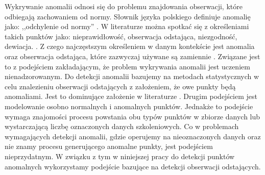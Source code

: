 Wykrywanie anomalii odnosi się do problemu znajdowania obserwacji, które odbiegają zachowaniem od normy. Słownik języka polskiego definiuje anomalię jako: ,,odchylenie od normy'' \cite{pwn}. 
W literaturze można spotkać się z określeniami takich punktów jako: nieprawidłowość, obserwacja odstająca, niezgodność, dewiacja. \cite{aggarwal2017outlier}. Z czego najczęstszym określeniem w danym kontekście jest anomalia oraz obserwacja odstająca, które zazwyczaj używane są zamiennie \cite{chandola2009anomaly}. Związane jest to z podejściem zakładającym, że problem wykrywania anomalii jest uczeniem nienadzorowanym. Do detekcji anomalii bazujemy na metodach statystycznych w celu znalezieniu obserwacji odstających z założeniem, że owe punkty będą anomaliami. Jest to dominujące założenie w literaturze \cite{emmott2015meta}. Drugim podejściem jest modelowanie osobno normalnych i anomalnych punktów. Jednakże to podejście wymaga znajomości procesu powstania obu typów punktów w zbiorze danych lub wystarczającą liczbę oznaczonych danych szkoleniowych. Co w problemach wymagających detekcji anomalii, gdzie operujemy na nieoznaczonych danych oraz nie znamy procesu generującego anomalne punkty, jest podejściem nieprzydatnym. W związku z tym w niniejszej pracy do detekcji punktów anomalnych wykorzystamy podejście bazujące na detekcji obserwacji odstających.
